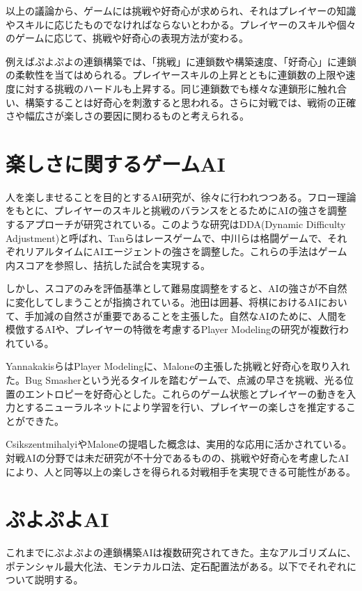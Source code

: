 \documentclass[12pt]{jreport}
\begin{document}
以上の議論から、ゲームには挑戦や好奇心が求められ、それはプレイヤーの知識やスキルに応じたものでなければならないとわかる。プレイヤーのスキルや個々のゲームに応じて、挑戦や好奇心の表現方法が変わる。

例えばぷよぷよの連鎖構築では、「挑戦」に連鎖数や構築速度、「好奇心」に連鎖の柔軟性を当てはめられる。プレイヤースキルの上昇とともに連鎖数の上限や速度に対する挑戦のハードルも上昇する。同じ連鎖数でも様々な連鎖形に触れ合い、構築することは好奇心を刺激すると思われる。さらに対戦では、戦術の正確さや幅広さが楽しさの要因に関わるものと考えられる。

\section{楽しさに関するゲームAI}
人を楽しませることを目的とするAI研究が、徐々に行われつつある。フロー理論をもとに、プレイヤーのスキルと挑戦のバランスをとるためにAIの強さを調整するアプローチが研究されている。このような研究はDDA(Dynamic Difficulty Adjustment)と呼ばれ、Tanら\cite{DDA_race}はレースゲームで、中川ら\cite{DDA_fight}は格闘ゲームで、それぞれリアルタイムにAIエージェントの強さを調整した。これらの手法はゲーム内スコアを参照し、拮抗した試合を実現する。

しかし、スコアのみを評価基準として難易度調整をすると、AIの強さが不自然に変化してしまうことが指摘されている。池田\cite{ikeda}は囲碁、将棋におけるAIにおいて、手加減の自然さが重要であることを主張した。自然なAIのために、人間を模倣するAIや、プレイヤーの特徴を考慮するPlayer Modelingの研究が複数行われている\cite{yan_panorama, adaptive}。

Yannakakisら\cite{yan_adaptive}はPlayer Modelingに、Maloneの主張した挑戦と好奇心を取り入れた。Bug Smasherという光るタイルを踏むゲームで、点滅の早さを挑戦、光る位置のエントロピーを好奇心とした。これらのゲーム状態とプレイヤーの動きを入力とするニューラルネットにより学習を行い、プレイヤーの楽しさを推定することができた。

CsikszentmihalyiやMaloneの提唱した概念は、実用的な応用に活かされている。対戦AIの分野では未だ研究が不十分であるものの、挑戦や好奇心を考慮したAIにより、人と同等以上の楽しさを得られる対戦相手を実現できる可能性がある。

\section{ぷよぷよAI}
これまでにぷよぷよの連鎖構築AIは複数研究されてきた。主なアルゴリズムに、ポテンシャル最大化法、モンテカルロ法、定石配置法がある。以下でそれぞれについて説明する。
\end{document}
